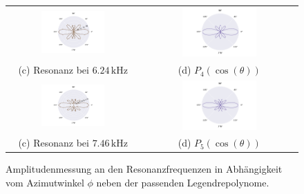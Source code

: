 \begin{figure}[H]
\begin{tabular}{cc}
  \includegraphics[width=0.5\textwidth]{Daten/Wasserstoff/neu/peak2.pdf} &   \includegraphics[width=0.5\textwidth]{Daten/Wasserstoff/peakLeg2.pdf} \\
  (c) Resonanz bei $6.24 \,\si{\kilo\hertz}$ & (d) $P_4(\cos(\theta))$ \\[6pt]
  \includegraphics[width=0.5\textwidth]{Daten/Wasserstoff/neu/peak3.pdf} &   \includegraphics[width=0.5\textwidth]{Daten/Wasserstoff/peakLeg3.pdf} \\
  (c) Resonanz bei $7.46 \,\si{\kilo\hertz}$ & (d) $P_5(\cos(\theta))$ \\[6pt]
  
  \end{tabular}
  \caption{Amplitudenmessung an den Resonanzfrequenzen in Abhängigkeit vom Azimutwinkel $\phi$ neben der passenden Legendrepolynome. } 
  \label{fig:hpeaks}
\end{figure}
